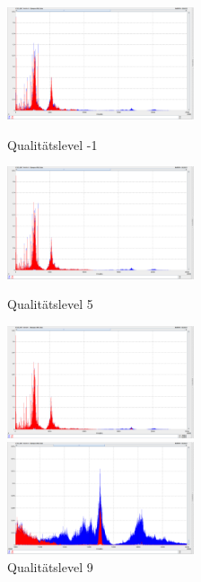 \documentclass{article}
\begin{document}
{\begin{figure}
		\end{figure}
	
	
		\begin{figure}

			\begin{varwidth}[t]{\linewidth}
				\includegraphics[width=0.49\textwidth]{Bilder/5.png}
				\caption{Qualitätslevel -1}
				\label{fig30}	
			\end{varwidth} %
			\begin{varwidth}[t]{\linewidth}
				\includegraphics[width=0.49\textwidth]{Bilder/6.png}
				\caption{Qualitätslevel 5}
				\label{fig31}
			\end{varwidth}
			\begin{varwidth}[t]{\linewidth}
				\includegraphics[width=0.49\textwidth]{Bilder/7.png}
				\caption{Qualitätslevel 9}
				\label{fig32}	
			\end{varwidth}
			\begin{varwidth}[t]{\linewidth}
				\includegraphics[width=0.49\textwidth]{Bilder/8.png}

\end{varwidth}
\end{figure}}
\end{document}
